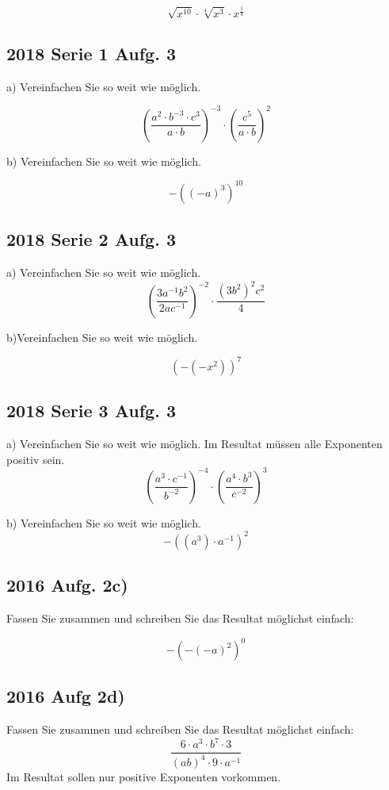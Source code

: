 $$\sqrt{x^{10}}  \cdot{}   \sqrt[4]{x^3} \cdot{}  x^{\frac{1}{4}}$$

\subsection{2018 Serie 1 Aufg. 3}
a) Vereinfachen Sie so weit wie möglich.

$$\left( \frac{a^2\cdot{}b^{-3}\cdot{}c^3}{a\cdot{b}} \right)^{-3}
\cdot{} \left(\frac{c^5}{a\cdot{}b} \right)^2$$

b) Vereinfachen Sie so weit wie möglich.

$$-\left( \left(-a\right)^3 \right)^{10}$$


\subsection{2018 Serie 2 Aufg. 3}
  a) Vereinfachen Sie so weit wie möglich.
  $$\left( \frac{3a^{-1}b^2}{2ac^{-1}}\right)^{-2} \cdot \frac{\left(3b^2 \right)^2 c^2}{4}$$

  b)Vereinfachen Sie so weit wie möglich.

$$\left( - \left( -x^2 \right) \right)^7$$

  \subsection{2018 Serie 3 Aufg. 3}
  a) Vereinfachen Sie so weit wie möglich. Im Resultat müssen alle
  Exponenten positiv sein.
  $$\left( \frac{a^3 \cdot{} c^{-1}}{b^{-2}} \right)^{-4}  \cdot  \left( \frac{a^4\cdot{}b^3}{c^{-2}} \right)^3 $$


  b) Vereinfachen Sie so weit wie möglich.
  $$-\left(  (a^3) \cdot{} a^{-1} \right)^2$$


\subsection{2016 Aufg. 2c)}
Fassen Sie zusammen und schreiben Sie das Resultat möglichst einfach:

$$-\left(  -\left( -a\right)^2   \right)^0$$  

\subsection{2016 Aufg 2d)}
Fassen Sie zusammen und schreiben Sie das Resultat möglichst einfach:
$$\frac{6\cdot{} a^3 \cdot{} b^7 \cdot{} 3}{(ab)^4 \cdot 9 \cdot a^{-1}}$$
Im Resultat sollen nur positive Exponenten vorkommen.

